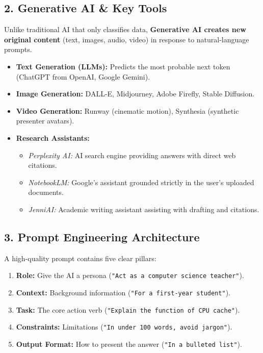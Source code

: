 \documentclass[a4paper,11pt]{article}
\begin{document}
\subsection{2. Generative AI \& Key Tools}
\begin{conceptbox}
Unlike traditional AI that only classifies data, \textbf{Generative AI creates new original content} (text, images, audio, video) in response to natural-language prompts.
\begin{itemize}[leftmargin=5mm]
    \item \textbf{Text Generation (LLMs):} Predicts the most probable next token (ChatGPT from OpenAI, Google Gemini).
    \item \textbf{Image Generation:} DALL-E, Midjourney, Adobe Firefly, Stable Diffusion.
    \item \textbf{Video Generation:} Runway (cinematic motion), Synthesia (synthetic presenter avatars).
    \item \textbf{Research Assistants:}
    \begin{itemize}
        \item \textit{Perplexity AI:} AI search engine providing answers with direct web citations.
        \item \textit{NotebookLM:} Google's assistant grounded strictly in the user's uploaded documents.
        \item \textit{JenniAI:} Academic writing assistant assisting with drafting and citations.
    \end{itemize}
\end{itemize}
\end{conceptbox}

\subsection{3. Prompt Engineering Architecture}
A high-quality prompt contains five clear pillars:
\begin{enumerate}[leftmargin=8mm]
    \item \textbf{Role:} Give the AI a persona (\texttt{"Act as a computer science teacher"}).
    \item \textbf{Context:} Background information (\texttt{"For a first-year student"}).
    \item \textbf{Task:} The core action verb (\texttt{"Explain the function of CPU cache"}).
    \item \textbf{Constraints:} Limitations (\texttt{"In under 100 words, avoid jargon"}).
    \item \textbf{Output Format:} How to present the answer (\texttt{"In a bulleted list"}).
\end{enumerate}
\end{document}

